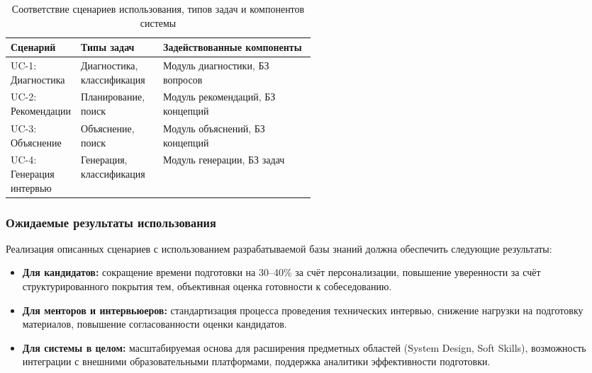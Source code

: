 \begin{table}[h]
\centering
\caption{Соответствие сценариев использования, типов задач и компонентов системы}
\label{tab:use-cases-summary}
\small
\setlength{\tabcolsep}{4pt}
\begin{tabularx}{\linewidth}{|>{\raggedright\arraybackslash}p{0.23\linewidth}|>{\raggedright\arraybackslash}p{0.27\linewidth}|>{\raggedright\arraybackslash}X|}
\hline
\textbf{Сценарий} & \textbf{Типы задач} & \textbf{Задействованные компоненты} \\ \hline
UC-1: Диагностика & Диагностика, классификация & Модуль диагностики, БЗ вопросов \\ \hline
UC-2: Рекомендации & Планирование, поиск & Модуль рекомендаций, БЗ концепций \\ \hline
UC-3: Объяснение & Объяснение, поиск & Модуль объяснений, БЗ концепций \\ \hline
UC-4: Генерация интервью & Генерация, классификация & Модуль генерации, БЗ задач \\ \hline
\end{tabularx}
\end{table}

\subsubsection*{Ожидаемые результаты использования}

Реализация описанных сценариев с использованием разрабатываемой базы знаний должна обеспечить следующие результаты:

\begin{itemize}
    \item \textbf{Для кандидатов:} сокращение времени подготовки на 30–40\% за счёт персонализации, повышение уверенности за счёт структурированного покрытия тем, объективная оценка готовности к собеседованию.
    
    \item \textbf{Для менторов и интервьюеров:} стандартизация процесса проведения технических интервью, снижение нагрузки на подготовку материалов, повышение согласованности оценки кандидатов.
    
    \item \textbf{Для системы в целом:} масштабируемая основа для расширения предметных областей (System Design, Soft Skills), возможность интеграции с внешними образовательными платформами, поддержка аналитики эффективности подготовки.
\end{itemize}

